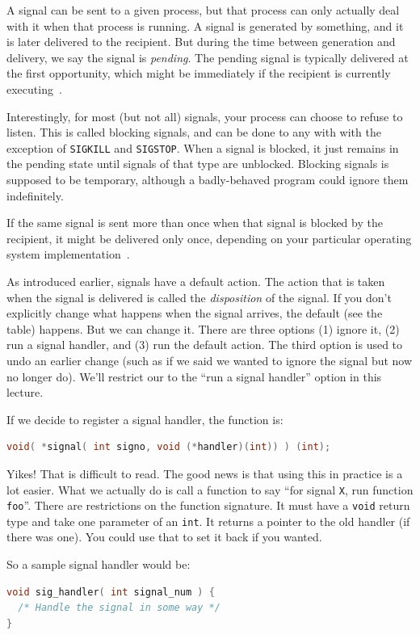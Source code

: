 A signal can be sent to a given process, but that process can only actually deal with it when that process is running. A signal is generated by something, and it is later delivered to the recipient. But during the time between generation and delivery, we say the signal is \textit{pending}. The pending signal is typically delivered at the first opportunity, which might be immediately if the recipient is currently executing~\cite{lpi}.

Interestingly, for most (but not all) signals, your process can choose to refuse to listen.  This is called blocking signals, and can be done to any with with the exception of \texttt{SIGKILL} and \texttt{SIGSTOP}. When a signal is blocked, it just remains in the pending state until signals of that type are unblocked. Blocking signals is supposed to be temporary, although a badly-behaved program could ignore them indefinitely. 

If the same signal is sent more than once when that signal is blocked by the recipient, it might be delivered only once, depending on your particular operating system implementation~\cite{apunix}.

As introduced earlier, signals have a default action. The action that is taken when the signal is delivered is called the \textit{disposition} of the signal. If you don't explicitly change what happens when the signal arrives, the default (see the table) happens. But we can change it. There are three options (1) ignore it, (2) run a signal handler, and (3) run the default action. The third option is used to undo an earlier change (such as if we said we wanted to ignore the signal but now no longer do). We'll restrict our to the ``run a signal handler'' option in this lecture. 

If we decide to register a signal handler, the function is:
\begin{lstlisting}[language=C]
void( *signal( int signo, void (*handler)(int)) ) (int);
\end{lstlisting}

Yikes! That is difficult to read. The good news is that using this in practice is a lot easier. What we actually do is call a function to say ``for signal \texttt{X}, run function \texttt{foo}''. There are restrictions on the function signature. It must have a \texttt{void} return type and take one parameter of an \texttt{int}. It returns a pointer to the old handler (if there was one). You could use that to set it back if you wanted. 

So a sample signal handler would be:
\begin{lstlisting}[language=C]
void sig_handler( int signal_num ) {
  /* Handle the signal in some way */
}
\end{lstlisting}

